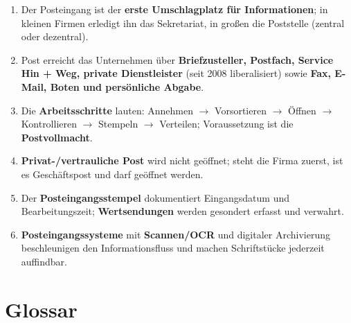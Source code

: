 \documentclass[11pt, a4paper]{article}
\begin{document}
\begin{enumerate}
  \item Der Posteingang ist der \textbf{erste Umschlagplatz für Informationen}; in kleinen Firmen erledigt ihn das Sekretariat, in großen die Poststelle (zentral oder dezentral).
  \item Post erreicht das Unternehmen über \textbf{Briefzusteller, Postfach, Service Hin + Weg, private Dienstleister} (seit 2008 liberalisiert) sowie \textbf{Fax, E-Mail, Boten und persönliche Abgabe}.
  \item Die \textbf{Arbeitsschritte} lauten: Annehmen $\rightarrow$ Vorsortieren $\rightarrow$ Öffnen $\rightarrow$ Kontrollieren $\rightarrow$ Stempeln $\rightarrow$ Verteilen; Voraussetzung ist die \textbf{Postvollmacht}.
  \item \textbf{Privat-/vertrauliche Post} wird nicht geöffnet; steht die Firma zuerst, ist es Geschäftspost und darf geöffnet werden.
  \item Der \textbf{Posteingangsstempel} dokumentiert Eingangsdatum und Bearbeitungszeit; \textbf{Wertsendungen} werden gesondert erfasst und verwahrt.
  \item \textbf{Posteingangssysteme} mit \textbf{Scannen/OCR} und digitaler Archivierung beschleunigen den Informationsfluss und machen Schriftstücke jederzeit auffindbar.
\end{enumerate}

\newpage

\section*{Glossar}






\end{document}
